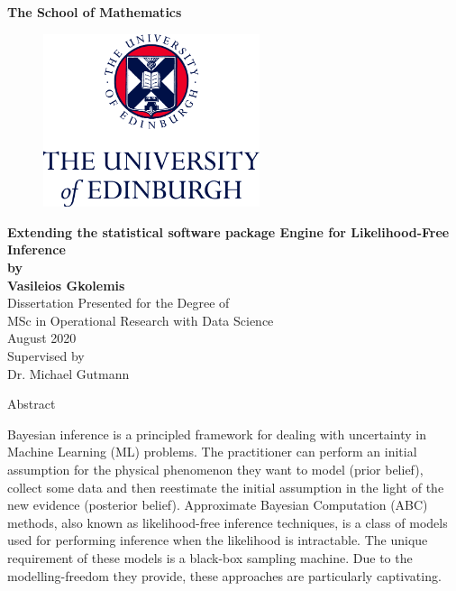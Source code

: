 \documentclass[11pt,twoside]{article}
\numberwithin{Theorem}{section}
\numberwithin{Definition}{section}
\numberwithin{Lemma}{section}
\numberwithin{Algorithm}{section}
\numberwithin{equation}{section}
\begin{document}
\pagestyle{empty}

\begin{titlepage}
\vspace*{.5em}
\center
\textbf{\large{The School of Mathematics}} \\
\vspace*{1em}
\begin{figure}[!h]
\centering
\includegraphics[width=180pt]{Thesis/images/CentredLogoCMYK.jpg}
\end{figure}
\vspace{2em}
\textbf{\Huge{Extending the statistical software package Engine for Likelihood-Free Inference}}\\[2em]
\textbf{\LARGE{by}}\\
\vspace{2em}
\textbf{\LARGE{Vasileios Gkolemis}}\\
\vspace{6.5em}
\Large{Dissertation Presented for the Degree of\\
MSc in Operational Research with Data Science}\\
\vspace{6.5em}
\Large{August 2020}\\
\vspace{3em}
\Large{Supervised by\\Dr. Michael Gutmann}
\vfill
\end{titlepage}

\cleardoublepage
\begin{center}
\Large{Abstract}
\end{center}

Bayesian inference is a principled framework for dealing with
uncertainty in Machine Learning (ML) problems. The practitioner can
perform an initial assumption for the physical phenomenon they want to
model (prior belief), collect some data and then reestimate the
initial assumption in the light of the new evidence (posterior
belief).  Approximate Bayesian Computation (ABC) methods, also known
as likelihood-free inference techniques, is a class of models used for
performing inference when the likelihood is intractable. The unique
requirement of these models is a black-box sampling machine. Due to
the modelling-freedom they provide, these approaches are particularly
captivating.
\end{document}
